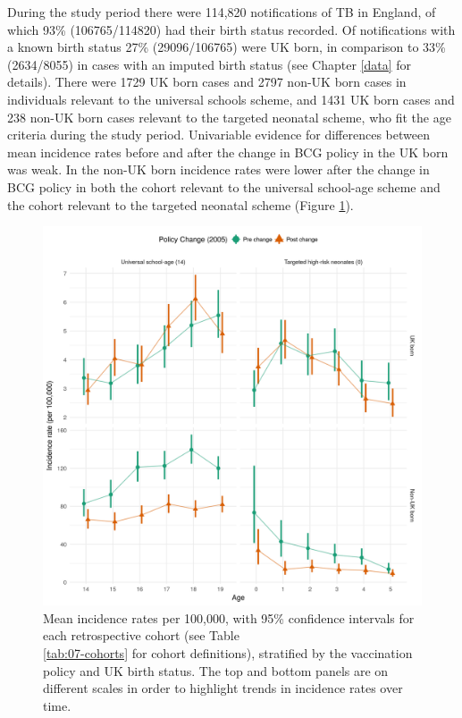 \documentclass[11pt,twoside]{bristolthesis}
\begin{document}
  During the study period there were 114,820 notifications of TB in England, of which 93\% (106765/114820) had their birth status recorded. Of notifications with a known birth status 27\% (29096/106765) were UK born, in comparison to 33\% (2634/8055) in cases with an imputed birth status (see Chapter \ref{data} for details). There were 1729 UK born cases and 2797 non-UK born cases in individuals relevant to the universal schools scheme, and 1431 UK born cases and 238 non-UK born cases relevant to the targeted neonatal scheme, who fit the age criteria during the study period. Univariable evidence for differences between mean incidence rates before and after the change in BCG policy in the UK born was weak. In the non-UK born incidence rates were lower after the change in BCG policy in both the cohort relevant to the universal school-age scheme and the cohort relevant to the targeted neonatal scheme (Figure \ref{fig:07-cohort-summary-plot}).
  \begin{figure}
  
  {\centering \includegraphics[width=0.8\linewidth]{chapters/direct-eff-bcg-change/figure-1} 
  
  }
  
  \caption{Mean incidence rates per 100,000, with 95\% confidence intervals for each retrospective cohort (see Table \\\ref{tab:07-cohorts} for cohort definitions), stratified by the vaccination policy and UK birth status. The top and bottom panels are on different scales in order to highlight trends in incidence rates over time.}\label{fig:07-cohort-summary-plot}
  \end{figure}
\end{document}
